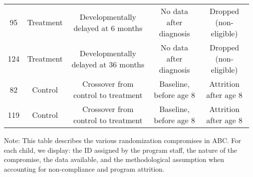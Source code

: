 \begin{sidewaystable}[H]
\begin{threeparttable}
\begin{tabular}{ccccc}
95   & Treatment       & Developmentally delayed at 6 months & No data after diagnosis & Dropped (non-eligible) \\ 
124 & Treatment       & Developmentally delayed at 36 months & No data after diagnosis & Dropped (non-eligible) \\ \midrule
 82 & Control       & Crossover from control to treatment & Baseline, before age 8 & Attrition after age 8 \\ 
 119 & Control       & Crossover from control to treatment & Baseline, before age 8 & Attrition after age 8   \\ \bottomrule
\end{tabular}
\begin{tablenotes}
\item Note: This table describes the various randomization compromises in ABC. For each child, we display: the ID assigned by the program staff, the nature of the compromise, the data available, and the methodological assumption when accounting for non-compliance and program attrition. 
\end{tablenotes}
\end{threeparttable}
\end{sidewaystable}
